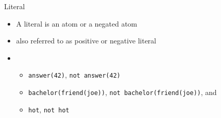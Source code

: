 \begin{frame}{Literal}
  \begin{itemize}
  \item A \alert{literal} is an atom or a negated atom
  \item[] also referred to as positive or negative literal
    \bigskip
  \item {}\small
    \begin{itemize}
    \item \lstinline{answer(42)}, \lstinline{not answer(42)}
    \item \lstinline{bachelor(friend(joe))}, \lstinline{not bachelor(friend(joe))}, and
    \item \lstinline{hot}, \lstinline{not hot}
    \end{itemize}
  \end{itemize}
\end{frame}
%
